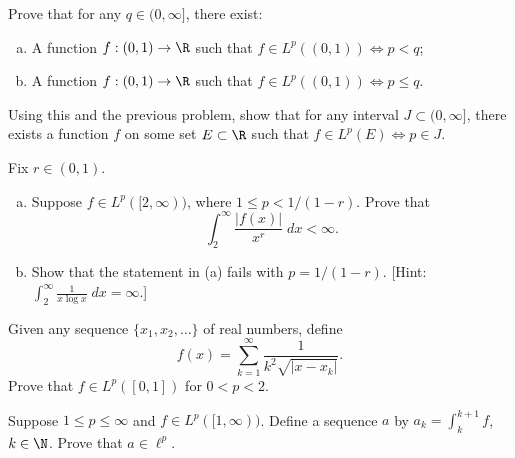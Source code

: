 \begin{hw} \label{hw:46}
Prove that for any $q \in (0, \infty]$, there exist:  
        \begin{enumerate}[a)]
        \item A function $f: (0, 1) \to \R$ such that $f \in L^p((0, 1)) \iff p < q$;
        \item A function $f: (0, 1)  \to \R$ such that $f \in L^p((0, 1)) \iff p \leq q$.
        \end{enumerate}
Using this and the previous problem, show that for any interval $J \subset (0, \infty]$, there exists a function $f$ on some set $E \subset \R$ such that $f \in L^p(E) \iff p \in J$. \\
\end{hw}






\begin{hw} \label{hw:47}
Fix $r \in (0, 1)$. 
	\begin{enumerate}[(a)]
	\item Suppose $f \in L^p([2, \infty))$, where $1\leq p<1/(1-r)$. Prove that 
		\[
		\int_2^\infty \dfrac{|f(x)|}{x^r} \;dx < \infty.
		\]
	\item Show that the statement in (a) fails with $p= 1/(1-r)$. [Hint: $\int_2^\infty \frac{1}{x\log x} \;dx= \infty$.]
	\end{enumerate} 
\end{hw}


\begin{hw} \label{hw:48}
Given any sequence $\{ x_1, x_2,\ldots \}$ of real numbers, define 
        \[
        f(x)= \sum_{k=1}^\infty \dfrac{1}{k^2 \sqrt{|x-x_k|}}.
        \]
Prove that $f \in L^p([0, 1])$ for $0< p < 2$. \\ 
\end{hw}






\begin{hw} \label{hw:49}
Suppose $1 \leq p \leq \infty $ and $f \in L^p([1,\infty))$. Define a sequence $a$ by $a_k= \int_k^{k+1} f$, $k \in \N$. Prove that $a \in \ell^p$. \\
\end{hw}


